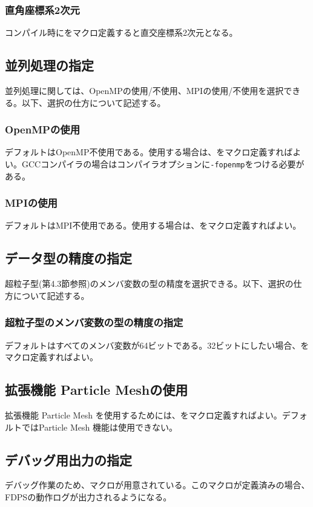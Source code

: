 \subsubsection{直角座標系2次元}
コンパイル時にをマクロ定義すると直交座標系2次元となる。

\subsection{並列処理の指定}
\label{subsec:macro_parallel}
並列処理に関しては、OpenMPの使用/不使用、MPIの使用/不使用を選択できる。以下、選択の仕方について記述する。

\subsubsection{OpenMPの使用}
デフォルトはOpenMP不使用である。使用する場合は、をマクロ定義すればよい。GCCコンパイラの場合はコンパイラオプションに\texttt{-fopenmp}をつける必要がある。

\subsubsection{MPIの使用}
デフォルトはMPI不使用である。使用する場合は、をマクロ定義すればよい。

\subsection{データ型の精度の指定}
\label{subsec:macro_FP_accuracy}
超粒子型(第4.3節参照)のメンバ変数の型の精度を選択できる。以下、選択の仕方について記述する。

\subsubsection{超粒子型のメンバ変数の型の精度の指定}
デフォルトはすべてのメンバ変数が64ビットである。32ビットにしたい場合、をマクロ定義すればよい。

\subsection{拡張機能 Particle Meshの使用}
\label{subsec:macro_PM}
拡張機能 Particle Mesh を使用するためには、をマクロ定義すればよい。デフォルトではParticle Mesh 機能は使用できない。

\subsection{デバッグ用出力の指定}
\label{subsec:macro_debug}
デバッグ作業のため、マクロが用意されている。このマクロが定義済みの場合、FDPSの動作ログが出力されるようになる。
